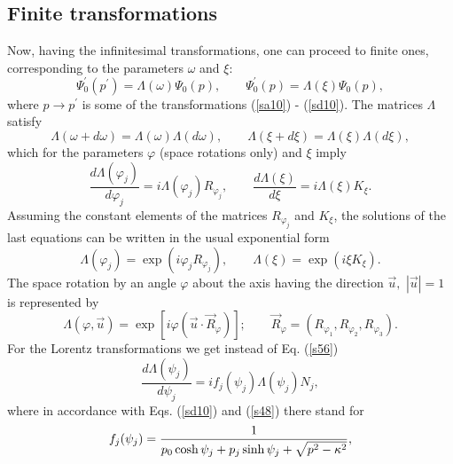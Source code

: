 \documentclass[a4paper,a4paper]{article}
\begin{document}
\subsection{Finite transformations}

Now, having the infinitesimal transformations, one can proceed to finite
ones, corresponding to the parameters $\omega $ and $\xi $: 
\begin{equation}
\Psi _{0}^{\prime }(p^{\prime })=\Lambda (\omega )\Psi _{0}(p),\qquad \Psi
_{0}^{\prime }(p)=\Lambda (\xi )\Psi _{0}(p),  \label{s54}
\end{equation}%
where $p\rightarrow p^{\prime }$ is some of the transformations (\ref{sa10})
- (\ref{sd10}). The matrices $\Lambda $ satisfy 
\begin{equation}
\Lambda (\omega +d\omega )=\Lambda (\omega )\Lambda (d\omega ),\qquad
\Lambda (\xi +d\xi )=\Lambda (\xi )\Lambda (d\xi ),  \label{s55}
\end{equation}%
which for the parameters $\varphi $ (space rotations only) and $\xi $ imply 
\begin{equation}
\frac{d\Lambda (\varphi _{j})}{d\varphi _{j}}=i\Lambda (\varphi
_{j})R_{\varphi _{j}},\qquad \frac{d\Lambda (\xi )}{d\xi }=i\Lambda (\xi
)K_{\xi }.  \label{s56}
\end{equation}%
Assuming the constant elements of the matrices $R_{\varphi _{j}}$ and $%
K_{\xi }$, the solutions of the last equations can be written in the usual
exponential form 
\begin{equation}
\Lambda (\varphi _{j})=\exp (i\varphi _{j}R_{\varphi _{j}}),\qquad \Lambda
(\xi )=\exp (i\xi K_{\xi }).  \label{s57}
\end{equation}%
The space rotation by an angle $\varphi $ about the axis having the
direction $\vec{u},$ $\left| \vec{u}\right| =1$ is represented by 
\begin{equation}
\Lambda (\varphi ,\vec{u})=\exp \left[ i\varphi \left( \vec{u}\cdot \vec{R}%
_{\varphi }\right) \right] ;\qquad \vec{R}_{\varphi }=\left( R_{\varphi
_{1}},R_{\varphi _{2}},R_{\varphi _{3}}\right) .  \label{sa57}
\end{equation}%
For the Lorentz transformations we get instead of Eq. (\ref{s56}) 
\begin{equation}
\frac{d\Lambda (\psi _{j})}{d\psi _{j}}=if_{j}(\psi _{j})\Lambda (\psi
_{j})N_{j},  \label{s58}
\end{equation}%
where in accordance with Eqs. (\ref{sd10}) and (\ref{s48}) there stand for 
\begin{equation}
f_{j}(\psi _{j})=\frac{1}{p_{0}\cosh \psi _{j}+p_{j}\sinh \psi _{j}+\sqrt{%
p^{2}-\kappa ^{2}}},  \label{s59}
\end{equation}%
\end{document}
